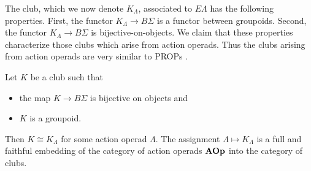 The club, which we now denote $K_{\Lambda}$, associated to $E\Lambda$ has the following properties. First, the functor $K_{\Lambda} \rightarrow B\Sigma$ is a functor between groupoids. Second, the functor $K_{\Lambda} \rightarrow B\Sigma$ is  bijective-on-objects. We claim that these properties characterize those clubs which arise from action operads. Thus the clubs arising from action operads are very similar to PROPs \cite{mac_prop, markl_prop}.

\begin{thm}\label{thm:club=operad}
Let $K$ be a club such that
\begin{itemize}
\item the map $K \rightarrow B\Sigma$ is bijective on objects and
\item $K$ is a groupoid.
\end{itemize}
Then $K \cong K_{\Lambda}$ for some action operad $\Lambda$. The assignment $\Lambda \mapsto K_{\Lambda}$ is a full and faithful embedding of the category of action operads $\mathbf{AOp}$ into the category of clubs.
\end{thm}
